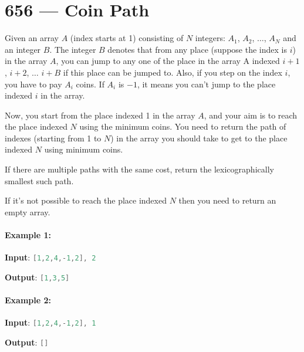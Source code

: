 \section{656 --- Coin Path}
Given an array $A$ (index starts at 1) consisting of $N$ integers: $A_1$, $A_2$, $\ldots$, $A_N$ and an integer $B$. The integer $B$ denotes that from any place (suppose the index is $i$) in the array $A$, you can jump to any one of the place in the array A indexed $i+1$, $i+2$, $\ldots$ $i+B$ if this place can be jumped to. Also, if you step on the index $i$, you have to pay $A_i$ coins. If $A_i$ is $-1$, it means you can’t jump to the place indexed $i$ in the array.

Now, you start from the place indexed 1 in the array $A$, and your aim is to reach the place indexed $N$ using the minimum coins. You need to return the path of indexes (starting from 1 to $N$) in the array you should take to get to the place indexed $N$ using minimum coins.

If there are multiple paths with the same cost, return the lexicographically smallest such path.

If it's not possible to reach the place indexed $N$ then you need to return an empty array.

\paragraph{Example 1:}

\begin{flushleft}
\textbf{Input}: \lstinline[language=Java, basicstyle=\small\ttfamily, keywordstyle=\bfseries\color{green!40!black}]|[1,2,4,-1,2], 2|

\textbf{Output}: \lstinline[language=Java, basicstyle=\small\ttfamily, keywordstyle=\bfseries\color{green!40!black}]|[1,3,5]|

\end{flushleft}
 

\paragraph{Example 2:}

\begin{flushleft}
\textbf{Input}: \lstinline[language=Java, basicstyle=\small\ttfamily, keywordstyle=\bfseries\color{green!40!black}]|[1,2,4,-1,2], 1|

\textbf{Output}: \lstinline[language=Java, basicstyle=\small\ttfamily, keywordstyle=\bfseries\color{green!40!black}]|[]|

\end{flushleft}
 

